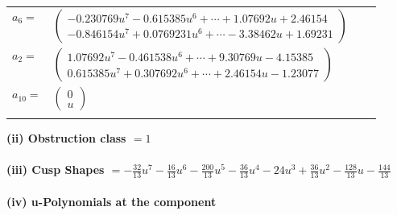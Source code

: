 \documentclass[1p]{elsarticle_modified}
\theoremstyle{definition}
\begin{document}
\begin{tabular}{m{7pt} m{180pt} m{7pt} m{180pt} }
\flushright $a_{6}=$&$\begin{pmatrix}-0.230769 u^{7}-0.615385 u^{6}+\cdots+1.07692 u+2.46154\\-0.846154 u^{7}+0.0769231 u^{6}+\cdots-3.38462 u+1.69231\end{pmatrix}$ \\
\flushright $a_{2}=$&$\begin{pmatrix}1.07692 u^{7}-0.461538 u^{6}+\cdots+9.30769 u-4.15385\\0.615385 u^{7}+0.307692 u^{6}+\cdots+2.46154 u-1.23077\end{pmatrix}$ \\
\flushright $a_{10}=$&$\begin{pmatrix}0\\u\end{pmatrix}$\\&\end{tabular}
\flushleft \textbf{(ii) Obstruction class $= 1$}\\~\\
\flushleft \textbf{(iii) Cusp Shapes $= -\frac{32}{13} u^7-\frac{16}{13} u^6-\frac{200}{13} u^5-\frac{36}{13} u^4-24 u^3+\frac{36}{13} u^2-\frac{128}{13} u-\frac{144}{13}$}\\~\\
\newpage\renewcommand{\arraystretch}{1}
\flushleft \textbf{(iv) u-Polynomials at the component}\newline \\
\end{document}
